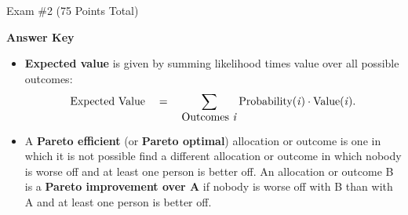 \documentclass[twoside]{article}
\begin{document}
\begin{center}
\Large Exam \#2 (75 Points Total) \begin{KEY}\textbf{Answer Key}\end{KEY}
\end{center}
\normalsize
\bigskip


\begin{EXAM}

\begin{itemize}

\begin{comment}
\item Take the exam during an \emph{uninterrupted period of no more than 3 hours}. (It should not take that long.) The space provided below each question should be sufficient for your answer, but you can use additional paper if needed. \emph{You are encouraged to show your work for partial credit.} It is very difficult to give partial credit if the only thing on your page is ``$x=3$".

\item \emph{Other than this cheat sheet, all you are allowed to use for help are the basic functions on a calculator.} Partial translation: no books, no notes, no websites, no talking to other people, and no advanced calculator features like programmable functions or present value formulas.

\item People who have taken the exam can talk to each other all they want, and people who have not taken the exam can talk to each other all they want, but communication between the two groups about class should be limited to three phrases: ``Yes", ``No", and ``Have you taken the exam?"

\item For questions or other emergencies, call me at x5124 or 206-351-5719.
\end{comment}
\item \textbf{Expected value} is given by summing likelihood times value over all possible outcomes:
\[
\mbox{Expected Value}\ \ \  = \ \ \ \sum_{\mbox{Outcomes \emph{i}}} \mbox{Probability(\emph{i})} \cdot \mbox{Value(\emph{i})}.
\]



\item A \textbf{Pareto efficient} (or \textbf{Pareto optimal}) allocation or outcome is one in which it is not possible find a different allocation or outcome in which nobody is worse off and at least one person is better off. An allocation or outcome B is a \textbf{Pareto improvement over A} if nobody is worse off with B than with A and at least one person is better off.


\end{itemize}
\end{EXAM}
\end{document}
